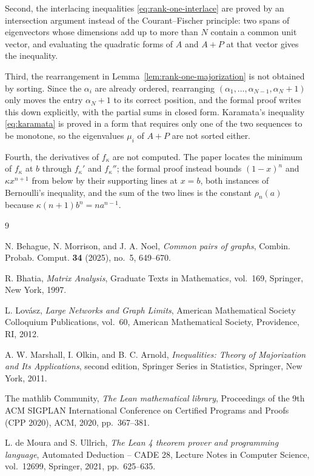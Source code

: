 \documentclass[11pt]{article}
\theoremstyle{definition}
\theoremstyle{remark}
\begin{document}
Second, the interlacing inequalities \eqref{eq:rank-one-interlace}
are proved by an intersection argument instead of the
Courant--Fischer principle: two spans of eigenvectors whose
dimensions add up to more than $N$ contain a common unit vector, and
evaluating the quadratic forms of $A$ and $A+P$ at that vector gives
the inequality.

Third, the rearrangement in Lemma~\ref{lem:rank-one-majorization} is
not obtained by sorting.  Since the $\alpha_i$ are already ordered,
rearranging $(\alpha_1,\ldots,\alpha_{N-1},\alpha_N+1)$ only moves
the entry $\alpha_N+1$ to its correct position, and the formal proof
writes this down explicitly, with the partial sums in closed form.
Karamata's inequality \eqref{eq:karamata} is proved in a form that
requires only one of the two sequences to be monotone, so the
eigenvalues $\mu_i$ of $A+P$ are not sorted either.

Fourth, the derivatives of $f_\kappa$ are not computed.  The paper
locates the minimum of $f_\kappa$ at $b$ through $f_\kappa'$ and
$f_\kappa''$; the formal proof instead bounds $(1-x)^n$ and
$\kappa x^{n+1}$ from below by their supporting lines at $x=b$, both
instances of Bernoulli's inequality, and the sum of the two lines is
the constant $\rho_n(a)$ because $\kappa(n+1)b^n=na^{n-1}$.

\begin{thebibliography}{9}

N. Behague, N. Morrison, and J. A. Noel,
\emph{Common pairs of graphs},
Combin. Probab. Comput. \textbf{34} (2025), no.~5, 649--670.

R. Bhatia,
\emph{Matrix Analysis},
Graduate Texts in Mathematics, vol.~169,
Springer, New York, 1997.

L. Lov\'asz,
\emph{Large Networks and Graph Limits},
American Mathematical Society Colloquium Publications, vol.~60,
American Mathematical Society, Providence, RI, 2012.

A. W. Marshall, I. Olkin, and B. C. Arnold,
\emph{Inequalities: Theory of Majorization and Its Applications},
second edition,
Springer Series in Statistics,
Springer, New York, 2011.

The mathlib Community,
\emph{The Lean mathematical library},
Proceedings of the 9th ACM SIGPLAN International Conference on
Certified Programs and Proofs (CPP 2020), ACM, 2020, pp.~367--381.

L. de Moura and S. Ullrich,
\emph{The Lean 4 theorem prover and programming language},
Automated Deduction -- CADE 28, Lecture Notes in Computer Science,
vol.~12699, Springer, 2021, pp.~625--635.

\end{thebibliography}
\end{document}
